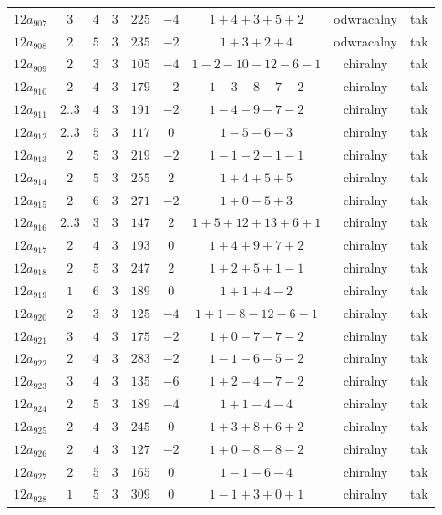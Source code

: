 \begin{longtable}{ccccccccc}
$12a_{907}$ & $3$ & $4$ & $3$ & $225$ & $-4$ & $1+4+3+5+2$ & odwracalny & tak \\
$12a_{908}$ & $2$ & $5$ & $3$ & $235$ & $-2$ & $1+3+2+4$ & odwracalny & tak \\
$12a_{909}$ & $2$ & $3$ & $3$ & $105$ & $-4$ & $1-2-10-12-6-1$ & chiralny & tak \\
$12a_{910}$ & $2$ & $4$ & $3$ & $179$ & $-2$ & $1-3-8-7-2$ & chiralny & tak \\
$12a_{911}$ & $2..3$ & $4$ & $3$ & $191$ & $-2$ & $1-4-9-7-2$ & chiralny & tak \\
$12a_{912}$ & $2..3$ & $5$ & $3$ & $117$ & $0$ & $1-5-6-3$ & chiralny & tak \\
$12a_{913}$ & $2$ & $5$ & $3$ & $219$ & $-2$ & $1-1-2-1-1$ & chiralny & tak \\
$12a_{914}$ & $2$ & $5$ & $3$ & $255$ & $2$ & $1+4+5+5$ & chiralny & tak \\
$12a_{915}$ & $2$ & $6$ & $3$ & $271$ & $-2$ & $1+0-5+3$ & chiralny & tak \\
$12a_{916}$ & $2..3$ & $3$ & $3$ & $147$ & $2$ & $1+5+12+13+6+1$ & chiralny & tak \\
$12a_{917}$ & $2$ & $4$ & $3$ & $193$ & $0$ & $1+4+9+7+2$ & chiralny & tak \\
$12a_{918}$ & $2$ & $5$ & $3$ & $247$ & $2$ & $1+2+5+1-1$ & chiralny & tak \\
$12a_{919}$ & $1$ & $6$ & $3$ & $189$ & $0$ & $1+1+4-2$ & chiralny & tak \\
$12a_{920}$ & $2$ & $3$ & $3$ & $125$ & $-4$ & $1+1-8-12-6-1$ & chiralny & tak \\
$12a_{921}$ & $3$ & $4$ & $3$ & $175$ & $-2$ & $1+0-7-7-2$ & chiralny & tak \\
$12a_{922}$ & $2$ & $4$ & $3$ & $283$ & $-2$ & $1-1-6-5-2$ & chiralny & tak \\
$12a_{923}$ & $3$ & $4$ & $3$ & $135$ & $-6$ & $1+2-4-7-2$ & chiralny & tak \\
$12a_{924}$ & $2$ & $5$ & $3$ & $189$ & $-4$ & $1+1-4-4$ & chiralny & tak \\
$12a_{925}$ & $2$ & $4$ & $3$ & $245$ & $0$ & $1+3+8+6+2$ & chiralny & tak \\
$12a_{926}$ & $2$ & $4$ & $3$ & $127$ & $-2$ & $1+0-8-8-2$ & chiralny & tak \\
$12a_{927}$ & $2$ & $5$ & $3$ & $165$ & $0$ & $1-1-6-4$ & chiralny & tak \\
$12a_{928}$ & $1$ & $5$ & $3$ & $309$ & $0$ & $1-1+3+0+1$ & chiralny & tak \\

\end{longtable}
